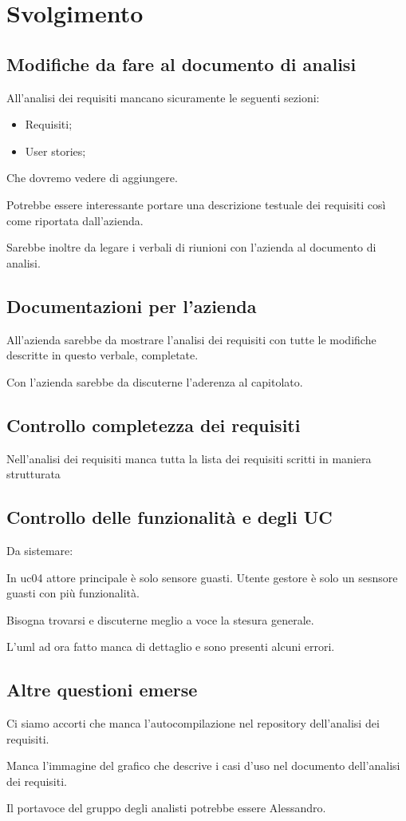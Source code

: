 \section{Svolgimento}

\subsection{Modifiche da fare al documento di analisi}

All'analisi dei requisiti mancano sicuramente le seguenti sezioni:
\begin{itemize}
    \item Requisiti;
    \item User stories;
\end{itemize}
Che dovremo vedere di aggiungere.

Potrebbe essere interessante portare una descrizione testuale dei requisiti così come riportata dall'azienda.

Sarebbe inoltre da legare i verbali di riunioni con l'azienda al documento di analisi.

\subsection{Documentazioni per l'azienda}

All'azienda sarebbe da mostrare l'analisi dei requisiti con tutte le modifiche descritte in questo verbale, completate.

Con l'azienda sarebbe da discuterne l'aderenza al capitolato.

\subsection{Controllo completezza dei requisiti}

Nell'analisi dei requisiti manca tutta la lista dei requisiti scritti in maniera strutturata

\subsection{Controllo delle funzionalità e degli UC}

Da sistemare: 

In uc04 attore principale è solo sensore guasti. Utente gestore è solo un sesnsore guasti con più funzionalità.

Bisogna trovarsi e discuterne meglio a voce la stesura generale.

L'uml ad ora fatto manca di dettaglio e sono presenti alcuni errori.

\subsection{Altre questioni emerse}

Ci siamo accorti che manca l'autocompilazione nel repository dell'analisi dei requisiti.

Manca l'immagine del grafico che descrive i casi d'uso nel documento dell'analisi dei requisiti.

Il portavoce del gruppo degli analisti potrebbe essere Alessandro.
